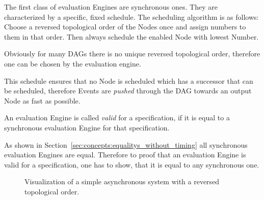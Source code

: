 The first class of evaluation Engines are synchronous ones.
They are characterized by a specific, fixed schedule.
The scheduling algorithm is as follows: Choose a reversed topological order of the Nodes once and assign numbers to them in that order.
Then always schedule the enabled Node with lowest Number.

Obviously for many DAGs there is no unique reversed topological order, therefore one can be chosen by the evaluation engine.

This schedule ensures that no Node is scheduled which has a successor that can be scheduled, therefore Events are \emph{pushed} through the DAG towards an output Node as fast as possible.

\begin{definition}
  An evaluation Engine is called \emph{valid} for a specification, if it is equal to a synchronous evaluation Engine for that specification.
\label{def:valid_eval_engine}
\end{definition}

As shown in Section~\ref{sec:concepts:equalitys_without_timing} all synchronous evaluation Engines are equal.
Therefore to proof that an evaluation Engine is valid for a specification, one has to show, that it is equal to any synchronous one.


\begin{figure}
  \caption{Visualization of a simple asynchronous system with a reversed topological order.}
\label{fig:chap3:sec_sync:visual_dag}
\end{figure}


